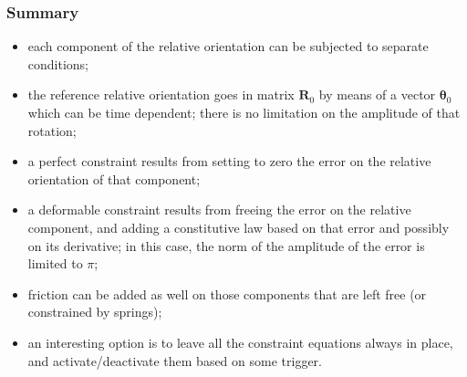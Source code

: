 \documentclass[10pt,dvips]{report}
\newcommand{\T}[1]{\boldsymbol{#1}}
\begin{document}
\subsubsection{Summary}
\begin{itemize}
\item each component of the relative orientation can be subjected
to separate conditions;
\item the reference relative orientation goes in matrix $\T{R}_0$
by means of a vector $\T{\theta}_0$ which can be time dependent;
there is no limitation on the amplitude of that rotation;
\item a perfect constraint results from setting to zero the error
on the relative orientation of that component;
\item a deformable constraint results from freeing the error
on the relative component, and adding a constitutive law
based on that error and possibly on its derivative;
in this case, the norm of the amplitude of the error is limited
to $\pi$;
\item friction can be added as well on those components
that are left free (or constrained by springs);
\item an interesting option is to leave all the constraint equations
always in place, and activate/deactivate them based on some trigger.
\end{itemize}
\end{document}
